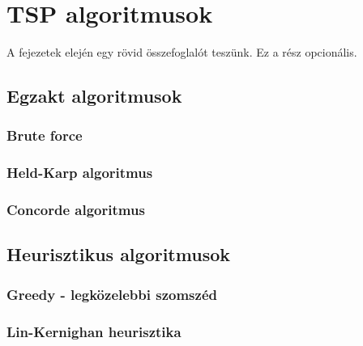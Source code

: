 \chapter{TSP algoritmusok}\label{ch:ALAP}

\begin{osszefoglal}
	A fejezetek elején egy rövid összefoglalót teszünk. Ez a rész opcionális.
	
\end{osszefoglal}

\section{Egzakt algoritmusok}\label{sec:ALAP:adatelem}

\subsection{Brute force}

\subsection{Held-Karp algoritmus}

\subsection{Concorde algoritmus}

\section{Heurisztikus algoritmusok}\label{sec:ALAP:adatelem}

\subsection{Greedy - legközelebbi szomszéd}

\subsection{Lin-Kernighan heurisztika}